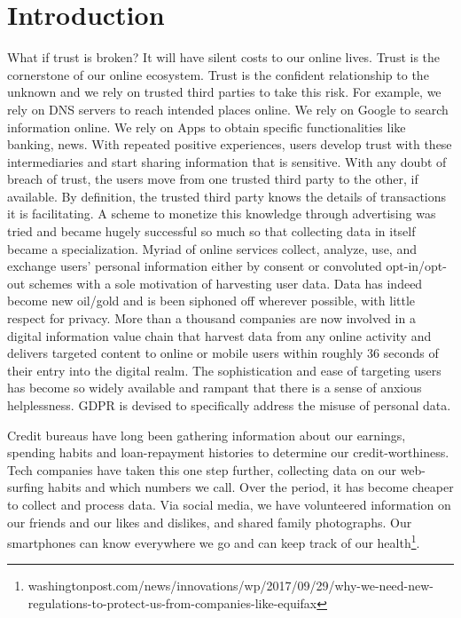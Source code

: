 \documentclass[runningheads]{llncs}
\begin{document}



\section{Introduction}

\noindent What if trust is broken? It will have silent costs to our
online lives. Trust is the cornerstone of our online ecosystem. Trust
is the confident relationship to the unknown and we rely on trusted
third parties to take this risk. For example, we rely on DNS servers
to reach intended places online. We rely on Google to search
information online. We rely on Apps to obtain specific functionalities
like banking, news. With repeated positive experiences, users develop
trust with these intermediaries and start sharing information that is
sensitive. With any doubt of breach of trust, the users move from one
trusted third party to the other, if available. By definition, the
trusted third party knows the details of transactions it is
facilitating. A scheme to monetize this knowledge through advertising
was tried and became hugely successful so much so that collecting data
in itself became a specialization. Myriad of online services collect,
analyze, use, and exchange users' personal information either by
consent or convoluted opt-in/opt-out schemes with a sole motivation of
harvesting user data. Data has indeed become new oil/gold and is been
siphoned off wherever possible, with little respect for privacy. More
than a thousand companies are now involved in a digital information
value chain that harvest data from any online activity and delivers
targeted content to online or mobile users within roughly 36 seconds
of their entry into the digital realm. The sophistication and ease of
targeting users has become so widely available and rampant that there
is a sense of anxious helplessness. GDPR is devised to specifically
address the misuse of personal data.

Credit bureaus have long been gathering information about our
earnings, spending habits and loan-repayment histories to determine
our credit-worthiness. Tech companies have taken this one step
further, collecting data on our web-surfing habits and which numbers
we call. Over the period, it has become cheaper to collect and process
data. Via social media, we have volunteered information on our friends
and our likes and dislikes, and shared family photographs. Our
smartphones can know everywhere we go and can keep track of our
health\footnote{washingtonpost.com/news/innovations/wp/2017/09/29/why-we-need-new-regulations-to-protect-us-from-companies-like-equifax}.
\end{document}
